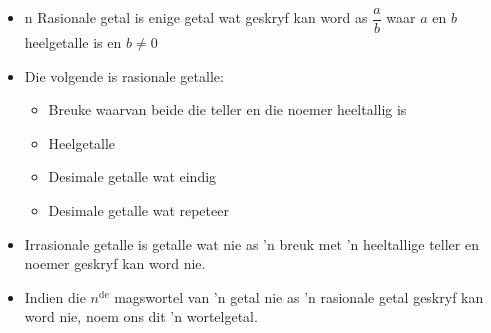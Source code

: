 

\begin{itemize}[itemsep=5pt, label=\textbullet{}]

\item n Rasionale getal is enige getal wat geskryf kan word as $\dfrac{a}{b}$
waar $a$ en $b$ heelgetalle is en $b\ne 0$\item Die volgende is rasionale getalle:
    \begin{itemize}[noitemsep]
	\item Breuke waarvan beide die teller en die noemer heeltallig is
	\item Heelgetalle
	\item Desimale getalle wat eindig
	\item Desimale getalle wat repeteer
    \end{itemize}
\item Irrasionale getalle is getalle wat nie as ’n breuk met ’n heeltallige teller en noemer geskryf kan word nie.
\item Indien die ${n}^{\mathrm{de}}$ magswortel van ’n getal nie as ’n rasionale getal geskryf kan word nie, noem ons dit ’n wortelgetal.

\end{itemize}

